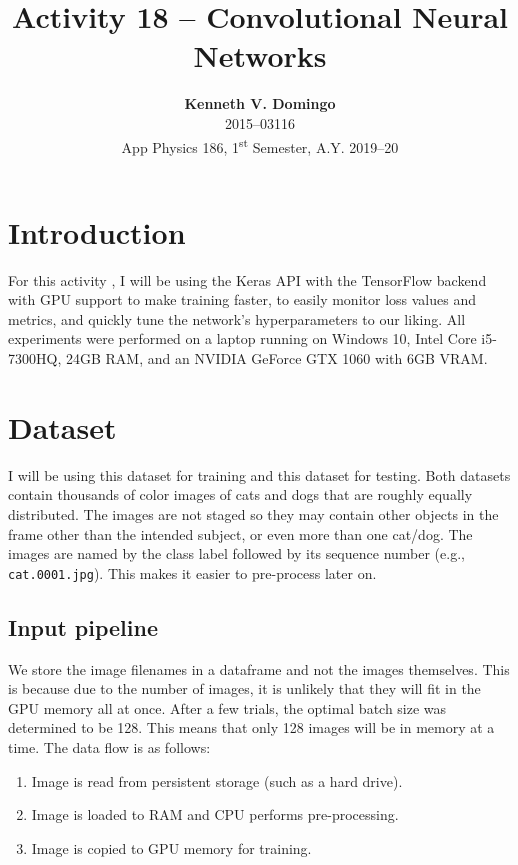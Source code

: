 \documentclass[12pt,a4paper]{article}
\newcommand{\activity}{Activity 18 -- Convolutional Neural Networks}
\begin{document}
\title{\TitleFont \activity}
\author[ ]{\textbf{Kenneth V. Domingo} \\
2015--03116 \\
App Physics 186, 1\textsuperscript{st} Semester, A.Y. 2019--20}

\maketitle
\thispagestyle{titlestyle}

\section{Introduction}
For this activity \cite{soriano}, I will be using the Keras API with the TensorFlow backend with GPU support to make training faster, to easily monitor loss values and metrics, and quickly tune the network's hyperparameters to our liking. All experiments were performed on a laptop running on Windows 10, Intel Core i5-7300HQ, 24GB RAM, and an NVIDIA GeForce GTX 1060 with 6GB VRAM.

\section{Dataset}
I will be using this dataset \cite{catdog-huge} for training and this dataset \cite{catdog-small} for testing. Both datasets contain thousands of color images of cats and dogs that are roughly equally distributed. The images are not staged so they may contain other objects in the frame other than the intended subject, or even more than one cat/dog. The images are named by the class label followed by its sequence number (e.g., \texttt{cat.0001.jpg}). This makes it easier to pre-process later on.

\subsection{Input pipeline}
We store the image filenames in a dataframe and not the images themselves. This is because due to the number of images, it is unlikely that they will fit in the GPU memory all at once. After a few trials, the optimal batch size was determined to be 128. This means that only 128 images will be in memory at a time. The data flow is as follows:

\begin{enumerate}
	\item Image is read from persistent storage (such as a hard drive).
	\item Image is loaded to RAM and CPU performs pre-processing.
	\item Image is copied to GPU memory for training.
\end{enumerate}
\end{document}
